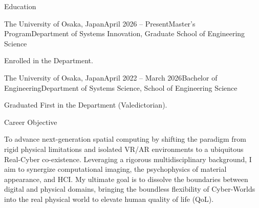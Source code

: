 \documentclass{resume} %
\begin{document}
\begin{rSection}{Education}

  \begin{rSubsection}{The University of Osaka, Japan}{April 2026 -- Present}{Master's Program}{Department of Systems Innovation, Graduate School of Engineering Science}
    \item Enrolled in the Department.
  \end{rSubsection}

  \begin{rSubsection}{The University of Osaka, Japan}{April 2022 -- March 2026}{Bachelor of Engineering}{Department of Systems Science, School of Engineering Science}
    \item Graduated First in the Department (Valedictorian).
  \end{rSubsection}

\end{rSection}

\begin{rSection}{Career Objective}
  \item To advance next-generation spatial computing by shifting the paradigm from rigid physical limitations and isolated VR/AR environments to a ubiquitous Real-Cyber co-existence. Leveraging a rigorous multidisciplinary background, I aim to synergize computational imaging, the psychophysics of material appearance, and HCI. My ultimate goal is to dissolve the boundaries between digital and physical domains, bringing the boundless flexibility of Cyber-Worlds into the real physical world to elevate human quality of life (QoL).
\end{rSection}
\end{document}
